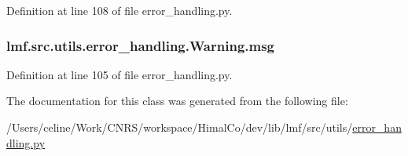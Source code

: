 Definition at line 108 of file error\+\_\+handling.\+py.

\hypertarget{classlmf_1_1src_1_1utils_1_1error__handling_1_1_warning_a0933de123c20a65d4226d8294d1e3506}{
\subsubsection[{msg}]{\setlength{\rightskip}{0pt plus 5cm}lmf.\+src.\+utils.\+error\+\_\+handling.\+Warning.\+msg}}\label{classlmf_1_1src_1_1utils_1_1error__handling_1_1_warning_a0933de123c20a65d4226d8294d1e3506}


Definition at line 105 of file error\+\_\+handling.\+py.



The documentation for this class was generated from the following file\+:\begin{DoxyCompactItemize}
\item 
/\+Users/celine/\+Work/\+C\+N\+R\+S/workspace/\+Himal\+Co/dev/lib/lmf/src/utils/\hyperlink{error__handling_8py}{error\+\_\+handling.\+py}\end{DoxyCompactItemize}
